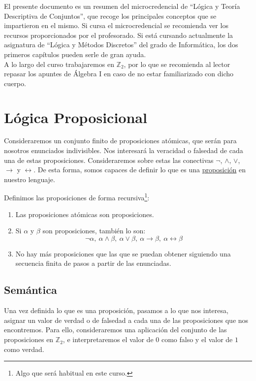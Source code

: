 El presente documento es un resumen del microcredencial de ``Lógica y Teoría Descriptiva de Conjuntos'', que recoge los principales conceptos que se impartieron en el mismo. Si cursa el microcredencial se recomienda ver los recursos proporcionados por el profesorado. Si está cursando actualmente la asignatura de ``Lógica y Métodos Discretos'' del grado de Informática, los dos primeros capítulos pueden serle de gran ayuda.\\

A lo largo del curso trabajaremos en $\mathbb{Z}_2$, por lo que se recomienda al lector repasar los apuntes de Álgebra I en caso de no estar familiarizado con dicho cuerpo.

\chapter{Lógica Proposicional}
Consideraremos un conjunto finito de proposiciones atómicas, que serán para nosotros enunciados indivisibles. Nos interesará la veracidad o falsedad de cada una de estas proposiciones. Consideraremos sobre estas las conectivas $\lnot$, $\land$, $\lor$, $\to$ y $\leftrightarrow$. De esta forma, somos capaces de definir lo que es una \underline{proposición} en nuestro lenguaje.

\begin{definicion}[Proposición]
    Definimos las proposiciones de forma recursiva\footnote{Algo que será habitual en este curso.}:
    \begin{enumerate}
        \item Las proposiciones atómicas son proposiciones.
        \item Si $\alpha$ y $\beta$ son proposiciones, también lo son:
            \begin{equation*}
                \lnot\alpha,\ \alpha\land\beta,\ \alpha\lor\beta,\ \alpha\to\beta,\ \alpha\leftrightarrow\beta
            \end{equation*}
        \item No hay más proposiciones que las que se puedan obtener siguiendo una secuencia finita de pasos a partir de las enunciadas.
    \end{enumerate}
\end{definicion}

\section{Semántica}
Una vez definida lo que es una proposición, pasamos a lo que nos interesa, asignar un valor de verdad o de falsedad a cada una de las proposiciones que nos encontremos. Para ello, consideraremos una aplicación del conjunto de las proposiciones en $\mathbb{Z}_2$, e interpretaremos el valor de $0$ como falso y el valor de $1$ como verdad.

